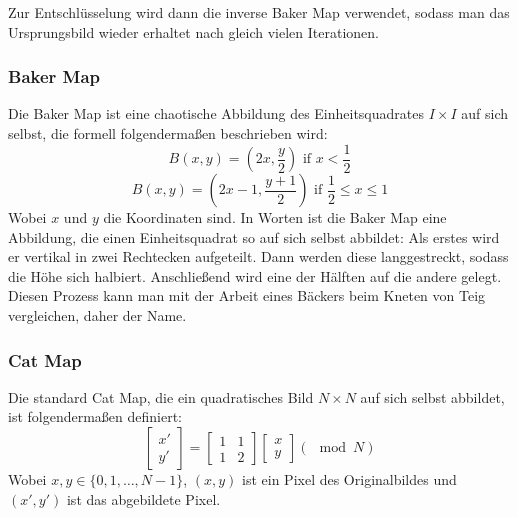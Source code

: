 Zur Entschlüsselung wird dann die inverse Baker Map verwendet, sodass man das Ursprungsbild wieder erhaltet nach gleich vielen Iterationen.

\subsubsection{Baker Map}
Die Baker Map ist eine chaotische Abbildung des Einheitsquadrates $I \times I$ auf sich selbst, die formell folgendermaßen beschrieben wird:
$$B(x, y) = (2x, \frac{y}{2}) \text{ if } x < \frac{1}{2}$$
$$B(x, y) = (2x - 1, \frac{y + 1}{2}) \text{ if } \frac{1}{2} \leq x \leq 1$$
Wobei $x$ und $y$ die Koordinaten sind.
In Worten ist die Baker Map eine Abbildung, die einen Einheitsquadrat so auf sich selbst abbildet: Als erstes wird er vertikal in zwei Rechtecken
aufgeteilt. Dann werden diese langgestreckt, sodass die Höhe sich halbiert. Anschließend wird eine der Hälften auf die andere gelegt. Diesen
Prozess kann man mit der Arbeit eines Bäckers beim Kneten von Teig vergleichen, daher der Name.
\cite{IEEEMap}

\subsubsection{Cat Map}
Die standard Cat Map, die ein quadratisches Bild $N \times N$ auf sich selbst abbildet, ist folgendermaßen definiert:
$$
	\begin{bmatrix} x' \\ y' \end{bmatrix} =
	\begin{bmatrix} 1 & 1 \\ 1 & 2 \end{bmatrix}
	\begin{bmatrix} x \\ y \end{bmatrix} (\mod N)
$$
Wobei $x, y \in \{0, 1, \dots , N - 1 \}$, $(x, y)$ ist ein Pixel des Originalbildes und $(x', y')$ ist das abgebildete Pixel.
\cite{catmap}

